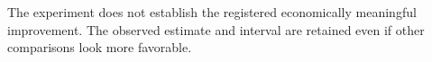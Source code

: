 The experiment does not establish the registered economically meaningful improvement. The observed estimate and interval are retained even if other comparisons look more favorable.

